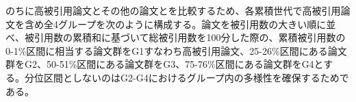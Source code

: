 のちに高被引用論文とその他の論文とを比較するため、各累積世代で高被引用論文を含め全4グループを次のように構成する。論文を被引用数の大きい順に並べ、被引用数の累積和に基づいて総被引用数を100分した際の、累積被引用数の0-1\%区間に相当する論文群をG1すなわち高被引用論文、25-26\%区間にある論文群をG2、50-51\%区間にある論文群をG3、75-76\%区間にある論文群をG4とする。分位区間としないのはG2-G4におけるグループ内の多様性を確保するためである。
